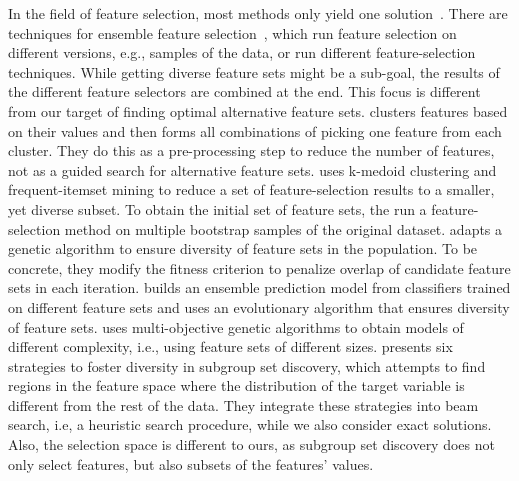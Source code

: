 \documentclass{article}
\theoremstyle{definition}
\begin{document}
In the field of feature selection, most methods only yield one solution~\cite{borboudakis2021extending}.
There are techniques for ensemble feature selection~\cite{saeys2008robust, seijo2017ensemble}, which run feature selection on different versions, e.g., samples of the data, or run different feature-selection techniques.
While getting diverse feature sets might be a sub-goal, the results of the different feature selectors are combined at the end.
This focus is different from our target of finding optimal alternative feature sets.
\cite{mueller2021feature} clusters features based on their values and then forms all combinations of picking one feature from each cluster.
They do this as a pre-processing step to reduce the number of features, not as a guided search for alternative feature sets.
\cite{woznica2012model} uses k-medoid clustering and frequent-itemset mining to reduce a set of feature-selection results to a smaller, yet diverse subset.
To obtain the initial set of feature sets, the run a feature-selection method on multiple bootstrap samples of the original dataset.
\cite{siddiqi2020genetic} adapts a genetic algorithm to ensure diversity of feature sets in the population.
To be concrete, they modify the fitness criterion to penalize overlap of candidate feature sets in each iteration.
\cite{liu2019subspace} builds an ensemble prediction model from classifiers trained on different feature sets and uses an evolutionary algorithm that ensures diversity of feature sets.
\cite{emmanouilidis1999selecting} uses multi-objective genetic algorithms to obtain models of different complexity, i.e., using feature sets of different sizes.
\cite{leeuwen2012diverse} presents six strategies to foster diversity in subgroup set discovery, which attempts to find regions in the feature space where the distribution of the target variable is different from the rest of the data.
They integrate these strategies into beam search, i.e, a heuristic search procedure, while we also consider exact solutions.
Also, the selection space is different to ours, as subgroup set discovery does not only select features, but also subsets of the features' values.
\end{document}
